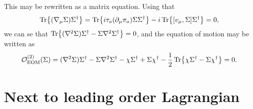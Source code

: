 \documentclass{article}
\begin{document}
This may be rewritten as a matrix equation. 
Using that 
\begin{align*}
    \Tr{(\nabla_\mu \Sigma)\Sigma^\dagger}
    = 
    \Tr{i \tau_a (\partial_\mu \pi_a )\Sigma \Sigma^\dagger}
    - i\Tr{[v_\mu, \Sigma]\Sigma^\dagger}
    = 0,
\end{align*}
we can se that $\Tr{(\nabla^2 \Sigma)\Sigma^\dagger - \Sigma \nabla^2 \Sigma^\dagger} = 0$, and the equation of motion may be written as
\begin{equation}
    \label{EOM matrix form}
    \mathcal{O}_\mathrm{EOM}^{(2)}(\Sigma) 
    = 
    (\nabla^2 \Sigma)\Sigma^\dagger
    - \Sigma \nabla^2 \Sigma^\dagger
    - \chi \Sigma^\dagger
    + \Sigma \chi^\dagger
    - \frac{1}{2}
    \Tr{ \chi \Sigma^\dagger - \Sigma \chi^\dagger} = 0.
\end{equation}


\section{Next to leading order Lagrangian}
\end{document}
